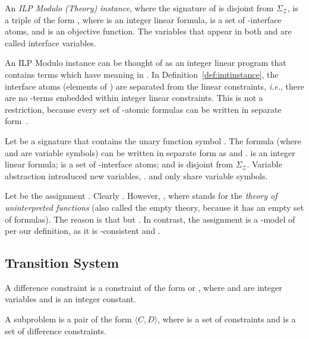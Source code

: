 \documentclass{llncs}
\newcommand{\ie}[0]{\emph{i.e.}, }
\newcommand{\subp}[2]{\ensuremath{\langle#1, #2\rangle}}
\newcommand{\SigmaZ}[0]{\ensuremath{\Sigma_{\mathcal{Z}}}}
\newcommand{\cd}{\subp{C}{D}}
\begin{document}
\begin{definition}
  An \emph{ILP Modulo (Theory)  instance}, where the signature
   of  is disjoint from \SigmaZ{}, is a triple of the form
  , where  is an integer linear formula,  is a set of
  -interface atoms, and  is an objective function. The
  variables that appear in both  and  are called interface
  variables.
  \label{def:imtinstance}
\end{definition}

An ILP Modulo  instance can be thought of as an integer linear
program that contains terms which have meaning in . In
Definition~\ref{def:imtinstance}, the interface atoms (elements of
) are separated from the linear constraints, \ie there are no
-terms embedded within integer linear constraints.  This is
not a restriction, because every set of -atomic formulas can be written in separate
form~\cite[``Variable Abstraction'']{combiningdp}.

\begin{example}
  Let  be a signature that contains the unary function symbol
  . The formula  (where  and  are
  variable symbols) can be written in separate form as  and .  is an integer linear formula;  is a
  set of -interface atoms; and  is disjoint from
  \SigmaZ{}. Variable abstraction introduced new variables, .  and  only share variable symbols.

  Let  be the assignment . Clearly . However, , where  stands for the \emph{theory
    of uninterpreted functions} (also called the empty theory, because
  it has an empty set of formulas). The reason is that  but
  . In contrast, the assignment  is a -model of
   per our definition, as it is -consistent and
  .
\label{ex:abstraction}
\end{example}

\subsection{Transition System}

\begin{definition}
  A difference constraint is a constraint of the form  or
  , where  and  are integer variables and
   is an integer constant.
\end{definition}

\begin{definition}[Subproblem]
  A subproblem is a pair of the form \cd{}, where  is a set of
  constraints and  is a set of difference constraints.
\end{definition}
\end{document}
